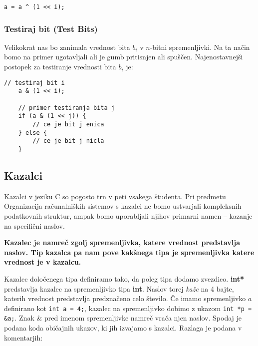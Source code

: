 \documentclass[12pt,letterpaper]{article}
\begin{document}
\begin{center}
\begin{lstlisting}[style=CStyle]
    a = a ^ (1 << i);
\end{lstlisting}
\end{center}
\newpage

\subsubsection*{Testiraj bit (Test Bits)}
Velikokrat nas bo zanimala vrednost bita $b_i$ v $n$-bitni spremenljivki. Na ta način bomo na primer ugotavljali ali je gumb pritisnjen ali spuščen. Najenostavnejši postopek za testiranje vrednosti bita $b_i$ je:

\begin{center}
\begin{lstlisting}[style=CStyle]
    // testiraj bit i
    a & (1 << i);
    
    // primer testiranja bita j
    if (a & (1 << j)) {
        // ce je bit j enica
    } else {
        // ce je bit j nicla
    }
\end{lstlisting}
\end{center}

\subsection*{Kazalci}

Kazalci v jeziku C so pogosto trn v peti vsakega študenta. Pri predmetu Organizacija računalniških sistemov s kazalci ne bomo ustvarjali kompleksnih podatkovnih struktur, ampak bomo uporabljali njihov primarni namen -- kazanje na specifični naslov.

\textbf{Kazalec je namreč zgolj spremenljivka, katere vrednost predstavlja naslov. Tip kazalca pa nam pove kakšnega tipa je spremenljivka katere vrednost je v kazalcu.}

Kazalec določenega tipa definiramo tako, da poleg tipa dodamo zvezdico. \textbf{int*} predstavlja kazalec na spremenljivko tipa \textbf{int}. Naslov torej \textit{kaže} na 4 bajte, katerih vrednost predstavlja predznačeno celo število. Če imamo spremenljivko $a$ definirano kot \texttt{int a = 4;}, kazalec na spremenljivko dobimo z ukazom \texttt{int *p = \&a;}. Znak \& pred imenom spremenljivke namreč vrača njen naslov. Spodaj je podana koda običajnih ukazov, ki jih izvajamo s kazalci. Razlaga je podana v komentarjih:
\end{document}
